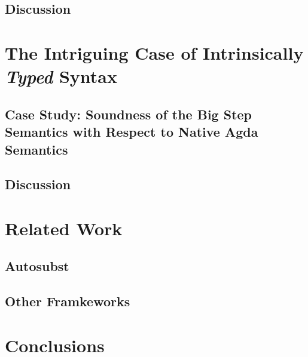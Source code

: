 \documentclass[screen,nonacm]{acmart}
\begin{document}
\subsection{Discussion}\label{sec:discussion-2}

\section{The Intriguing Case of Intrinsically \emph{Typed} Syntax}\label{sec:intrinsic}

\subsection{Case Study: Soundness of the Big Step Semantics with Respect to Native Agda Semantics}\label{sec:soundness}

\subsection{Discussion}\label{sec:discussion-3}

\section{Related Work}\label{sec:related-work}

\subsection{Autosubst}\label{sec:autosubst}

\citet{10.1145/3293880.3294101}

\subsection{Other Framkeworks}\label{sec:related-frameworks}

\section{Conclusions}\label{sec:conclusions}



\end{document}
